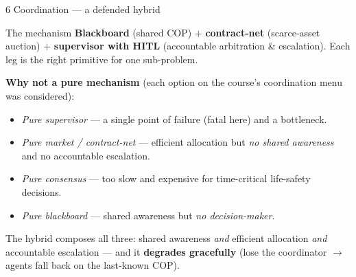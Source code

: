 \documentclass[aspectratio=169,11pt]{beamer}
\begin{document}
\begin{frame}{6 \;\; Coordination --- a defended hybrid}
  \small
  \begin{block}{The mechanism}
    \textbf{Blackboard} (shared COP) $+$ \textbf{contract-net} (scarce-asset auction) $+$
    \textbf{supervisor with HITL} (accountable arbitration \& escalation). Each leg is the right
    primitive for one sub-problem.
  \end{block}
  \textbf{Why not a pure mechanism} (each option on the course's coordination menu was considered):
  \begin{itemize}\footnotesize
    \item \emph{Pure supervisor} --- a single point of failure (fatal here) and a bottleneck.
    \item \emph{Pure market / contract-net} --- efficient allocation but \emph{no shared awareness}
      and no accountable escalation.
    \item \emph{Pure consensus} --- too slow and expensive for time-critical life-safety decisions.
    \item \emph{Pure blackboard} --- shared awareness but \emph{no decision-maker}.
  \end{itemize}
  The hybrid composes all three: shared awareness \emph{and} efficient allocation \emph{and}
  accountable escalation --- and it \textbf{degrades gracefully} (lose the coordinator $\rightarrow$
  agents fall back on the last-known COP).
\end{frame}
\end{document}
